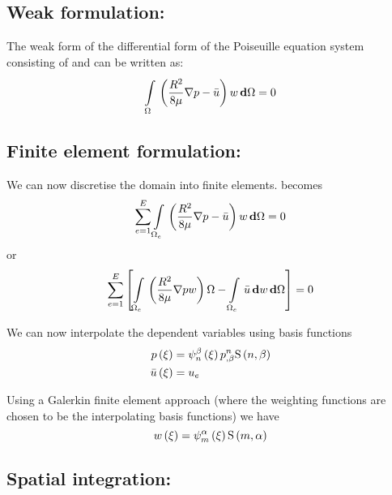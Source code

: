 \subsection{Weak formulation:}

The weak form of the differential form of the Poiseuille equation system
consisting of  and can be written as:
\begin{equation}
  \gint{\Omega}{}{\pbrac{\dfrac{R^{2}}{8\mu}\gradient{}{p}-\bar{u}}w}{\Omega}=0
  \label{eqn:Poiseuilleweakform}
\end{equation}

\subsection{Finite element formulation:}
We can now discretise the domain into finite elements.  becomes
\begin{equation}
  \dsum_{e=1}^{E}\gint{\Omega_{e}}{}{\pbrac{\frac{R^{2}}{8\mu}\gradient{}{p}-\bar{u}}w}{\Omega}=0
  \label{eqn:Poiseullefemform1}
\end{equation}
or
\begin{equation}
  \dsum_{e=1}^{E}\sqbrac{\gint{\Omega_{e}}{}{\pbrac{\frac{R^{2}}{8\mu}\gradient{}{p}w}{\Omega}-\gint{\Omega_{e}}{}{\bar{u}}w}{\Omega}}=0
  \label{eqn:Poiseullefemform2}
\end{equation}

We can now interpolate the dependent variables using basis functions
\begin{equation}
  \begin{split}
     p\left( \xi \right)  &=    \psi_{n}^{\beta} \left( \xi \right)    {p}^{n} _{,\beta}    \mathrm{S} \left( n,\beta \right)   \\
     \bar{u}\left( \xi \right)  &=  u_{e} 
  \end{split}
\end{equation}

Using a Galerkin finite element approach (where the weighting functions are
chosen to be the interpolating basis functions) we have 
\begin{equation}
   w\left( \xi \right) =   \psi_{m}^{\alpha} \left( \xi \right)     \mathrm{S} \left( m,\alpha \right)  
\end{equation}

\subsection{Spatial integration:}

